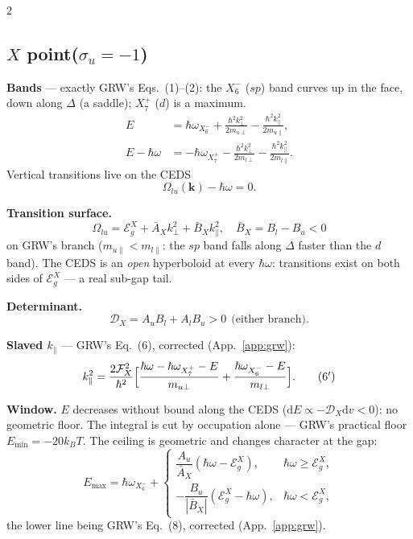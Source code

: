 \documentclass[11pt,a4paper]{article}
\numberwithin{equation}{section}
\newcommand{\hw}{\hbar\omega}
\newcommand{\EgX}{\mathcal{E}_g^{X}}
\newcommand{\cD}{\mathcal{D}}
\newcommand{\cF}{\mathcal{F}}
\newcommand{\Ab}{\bar{A}}
\newcommand{\Bb}{\bar{B}}
\newcommand{\kperp}{k_{\perp}}
\newcommand{\kpar}{k_{\parallel}}
\newcommand{\dd}{\mathrm{d}}
\newcommand{\wXu}{\hbar\omega_{X_6^-}}
\newcommand{\wXl}{\hbar\omega_{X_7^+}}
\newcommand{\kB}{k_B}
\begin{document}
\setlength{\columnseprule}{0.4pt}
\begin{paracol}{2}

\begin{leftcolumn}
\subsection*{$X$ point\quad ($\sigma_u=-1$)}

\textbf{Bands} --- exactly GRW's Eqs.\ (1)--(2): the $X_6^-$ ($sp$)
band curves up in the face, down along $\Delta$ (a saddle); $X_7^+$
($d$) is a maximum.
\begin{align}
E&=\wXu+\frac{\hbar^2\kperp^2}{2m_{u\perp}}
       -\frac{\hbar^2\kpar^2}{2m_{u\parallel}},
\tag{1}\\
E-\hw&=-\wXl-\frac{\hbar^2\kperp^2}{2m_{l\perp}}
       -\frac{\hbar^2\kpar^2}{2m_{l\parallel}} .
\tag{2}
\end{align}
Vertical transitions live on the CEDS
\begin{equation}
\Omega_{lu}(\mathbf k)-\hw=0 .
\tag{3}
\end{equation}

\textbf{Transition surface.}
\[
\Omega_{lu}=\EgX+\Ab_X\kperp^2+\Bb_X\kpar^2,\quad
\Bb_X=B_l-B_u<0
\]
on GRW's branch ($m_{u\parallel}<m_{l\parallel}$: the $sp$ band falls
along $\Delta$ faster than the $d$ band).  The CEDS is an \emph{open}
hyperboloid at every $\hw$: transitions exist on both sides of
$\EgX$ --- a real sub-gap tail.

\textbf{Determinant.}
\[
\cD_X=A_uB_l+A_lB_u>0\ \ \text{(either branch)} .
\]

\textbf{Slaved $\kpar$} --- GRW's Eq.\ (6), corrected
(App.~\ref{app:grw}):
\[
\kpar^{2}
=\frac{2\cF_X^{2}}{\hbar^{2}}\Bigl[
\frac{\hw-\wXl-E}{m_{u\perp}}
+\frac{\wXu-E}{m_{l\perp}}\Bigr].
\tag{6$'$}
\]

\textbf{Window.}  $E$ decreases without bound along the CEDS
($\dd E\propto-\cD_X\dd v<0$): no geometric floor.  The integral is
cut by occupation alone --- GRW's practical floor
$E_{\min}=-20\kB T$.  The ceiling is geometric and changes character
at the gap:
\[
E_{\max}=\wXu+
\begin{cases}
\dfrac{A_u}{\Ab_X}(\hw-\EgX), & \hw\ge\EgX,\\[10pt]
-\dfrac{B_u}{|\Bb_X|}(\EgX-\hw), & \hw<\EgX,
\end{cases}
\tag{8$'$}
\]
the lower line being GRW's Eq.\ (8), corrected (App.~\ref{app:grw}).


\end{leftcolumn}
\end{paracol}
\end{document}
